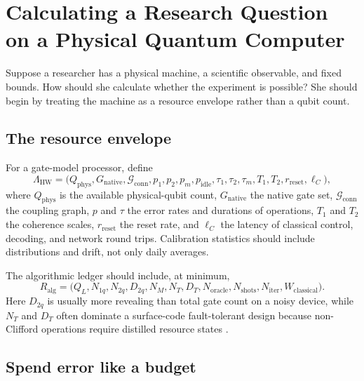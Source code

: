 \section{Calculating a Research Question on a Physical Quantum Computer}\label{sec:resources}

Suppose a researcher has a physical machine, a scientific observable, and fixed bounds. How should she calculate whether the experiment is possible? She should begin by treating the machine as a resource envelope rather than a qubit count.

\subsection{The resource envelope}

For a gate-model processor, define
\begin{equation}
\Lambda_{\mathrm{HW}}=
\bigl(Q_{\mathrm{phys}},G_{\mathrm{native}},\mathcal{G}_{\mathrm{conn}},
p_{1},p_{2},p_m,p_{\mathrm{idle}},
\tau_{1},\tau_{2},\tau_m,T_1,T_2,
r_{\mathrm{reset}},\ell_C\bigr),
\end{equation}
where $Q_{\mathrm{phys}}$ is the available physical-qubit count, $G_{\mathrm{native}}$ the native gate set, $\mathcal{G}_{\mathrm{conn}}$ the coupling graph, $p$ and $\tau$ the error rates and durations of operations, $T_1$ and $T_2$ the coherence scales, $r_{\mathrm{reset}}$ the reset rate, and $\ell_C$ the latency of classical control, decoding, and network round trips. Calibration statistics should include distributions and drift, not only daily averages.

The algorithmic ledger should include, at minimum,
\begin{equation}
R_{\mathrm{alg}}=
\bigl(Q_L,N_{1q},N_{2q},D_{2q},N_M,N_T,D_T,N_{\mathrm{oracle}},
N_{\mathrm{shots}},N_{\mathrm{iter}},W_{\mathrm{classical}}\bigr).
\end{equation}
Here $D_{2q}$ is usually more revealing than total gate count on a noisy device, while $N_T$ and $D_T$ often dominate a surface-code fault-tolerant design because non-Clifford operations require distilled resource states \citep{fowler2012,gidney2021,vandam2024}.

\subsection{Spend error like a budget}


